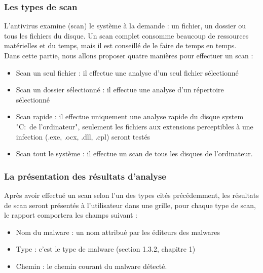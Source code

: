 \subsubsection{Les types de scan} 
L'antivirus examine (scan) le système à la demande : un fichier, un dossier ou tous les fichiers du disque. Un scan complet consomme beaucoup de ressources matérielles et du temps, mais il est conseillé de le faire de temps en temps.\\


Dans cette partie, nous allons proposer quatre manières pour effectuer un scan :\\

\begin{itemize}
\item Scan un seul fichier : il effectue une analyse d'un seul fichier sélectionné  
\item Scan un dossier sélectionné : il effectue une analyse d'un répertoire  sélectionné  
\item Scan rapide : il effectue uniquement une analyse rapide du disque system "C:\ de l'ordinateur", seulement les fichiers aux extensions perceptibles à une infection (.exe, .ocx, .dll, .cpl) seront testés
\item Scan tout le système : il effectue un scan de tous les disques de l'ordinateur.

\end{itemize}
\subsubsection{La présentation des résultats d'analyse}
Après avoir effectué un scan selon l'un des types cités précédemment, les résultats de scan seront présentés à l'utilisateur dans une grille, pour chaque type de scan, le rapport comportera les champs suivant :
\begin{itemize}

\item Nom du malware : un nom attribué par les éditeurs des malwares
\item Type : c'est le type de malware (section 1.3.2, chapitre 1)
\item Chemin : le chemin courant du malware détecté.  

\end{itemize}
